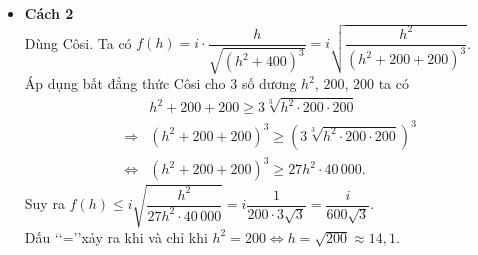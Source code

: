 \begin{ex}
{\begin{itemize}
\begin{center}
\end{center}
Từ bảng biến thiên suy ra $\max f(h)$ khi $h=10\sqrt{2}\approx 14{,}1$.
\item \textbf{Cách 2}\\
Dùng Côsi. Ta có
$f(h)=i\cdot \dfrac{h}{\sqrt{\left(h^2+400\right)^3}}=i\sqrt{\dfrac{h^2}{\left(h^2+200+200\right)^3}}$.\\
Áp dụng bất đẳng thức Côsi cho $3$ số dương $h^2$, $200$, $200$ ta có
\begin{eqnarray*}
& &	h^2+200+200\geq 3\sqrt[3]{h^2\cdot 200\cdot 200}\\
&\Rightarrow& \left(h^2+200+200\right)^3\geq \left(3\sqrt[3]{h^2\cdot 200\cdot 200}\right)^3\\
&\Leftrightarrow & \left(h^2+200+200\right)^3\geq 27h^2\cdot 40\, 000.
\end{eqnarray*}
Suy ra $f(h)\leq i\sqrt{\dfrac{h^2}{27h^2\cdot 40\, 000}}=i\dfrac{1}{200\cdot 3\sqrt{3}}=\dfrac{i}{600\sqrt{3}}$.\\
Dấu \lq \lq =\rq \rq xảy ra khi và chỉ khi $h^2=200\Leftrightarrow h=\sqrt{200}\approx 14{,}1$.
\end{itemize}
}
\end{ex}

